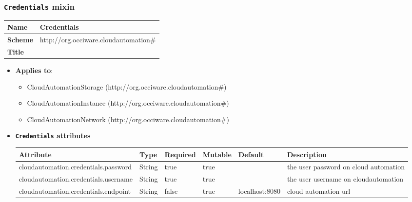  
\subsubsection{\texttt{Credentials} mixin}
\begin{center}
\begin{tabular}{|l|l|}
  \hline
  \textbf{Name} & Credentials \\
  \hline  
  \textbf{Scheme} & http://org.occiware.cloudautomation\# \\
  \hline
  \textbf{Title} &  \\
  \hline
\end{tabular}
\end{center}
\begin{itemize}
\item \textbf{Applies to}:
\begin{itemize}
	\item CloudAutomationStorage (http://org.occiware.cloudautomation\#)
	\item CloudAutomationInstance (http://org.occiware.cloudautomation\#)
	\item CloudAutomationNetwork (http://org.occiware.cloudautomation\#)
\end{itemize}
\end{itemize} 

\begin{itemize}
\item \textbf{\texttt{Credentials} attributes}

\begin{tabularx}{\textwidth}{|l|l|p{1.4cm}|p{1.3cm}|l|X|}
  \hline
  \textbf{Attribute} & \textbf{Type} & \textbf{Required} & \textbf{Mutable} & \textbf{Default} & \textbf{Description} \\
  \hline  
  cloudautomation.credentials.password & String & true & true &  & the user password on cloud automation \\
  \hline
  cloudautomation.credentials.username & String & true & true &  & the user username on cloudautomation \\
  \hline
  cloudautomation.credentials.endpoint & String & false & true & localhost:8080 & cloud automation url \\
  \hline
\end{tabularx}
\end{itemize}


 
